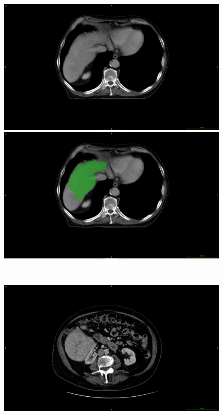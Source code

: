 \begin{figure}[ht!]
	\begin{mdframed}[backgroundcolor=blue!50,linecolor=blue!50]
		\centering
		\begin{minipage}{0.45\linewidth}
			\includegraphics[width=\linewidth]{images/MisSegmentations/TCGA-DD-A3A1_slice80_raw}
		\end{minipage} \hspace{-0.1cm}
		\begin{minipage}{0.45\linewidth}
			\includegraphics[width=\linewidth]{images/MisSegmentations/TCGA-DD-A3A1_slice80_liverPrediction_Cmap}
		\end{minipage} \\
		\begin{minipage}{0.45\linewidth}
			\includegraphics[width=\linewidth]{images/MisSegmentations/TCGA-DD-A4NK_slice32_raw}

\end{minipage}
\end{mdframed}
\end{figure}
